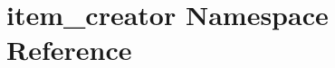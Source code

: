 \hypertarget{namespaceitem__creator}{\section{item\-\_\-creator Namespace Reference}
\label{namespaceitem__creator}
}
